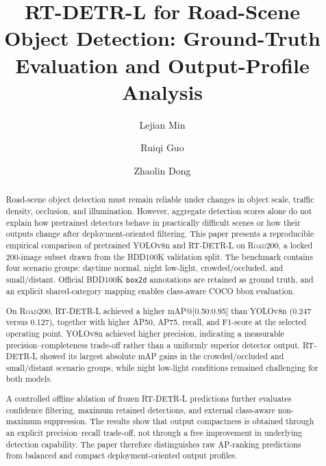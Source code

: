 \documentclass[runningheads]{llncs}
\begin{document}
\title{RT-DETR-L for Road-Scene Object Detection: Ground-Truth Evaluation and Output-Profile Analysis}

\author{
Lejian Min
\and Ruiqi Guo
\and Zhaolin Dong
}



\maketitle

\begin{abstract}
Road-scene object detection must remain reliable under changes in object scale, traffic density, occlusion, and illumination. However, aggregate detection scores alone do not explain how pretrained detectors behave in practically difficult scenes or how their outputs change after deployment-oriented filtering. This paper presents a reproducible empirical comparison of pretrained YOLOv8n and RT-DETR-L on \textsc{Road200}, a locked 200-image subset drawn from the BDD100K validation split. The benchmark contains four scenario groups: daytime normal, night low-light, crowded/occluded, and small/distant. Official BDD100K \texttt{box2d} annotations are retained as ground truth, and an explicit shared-category mapping enables class-aware COCO bbox evaluation.

On \textsc{Road200}, RT-DETR-L achieved a higher mAP@[0.50:0.95] than YOLOv8n (0.247 versus 0.127), together with higher AP50, AP75, recall, and F1-score at the selected operating point. YOLOv8n achieved higher precision, indicating a measurable precision--completeness trade-off rather than a uniformly superior detector output. RT-DETR-L showed its largest absolute mAP gains in the crowded/occluded and small/distant scenario groups, while night low-light conditions remained challenging for both models.

A controlled offline ablation of frozen RT-DETR-L predictions further evaluates confidence filtering, maximum retained detections, and external class-aware non-maximum suppression. The results show that output compactness is obtained through an explicit precision--recall trade-off, not through a free improvement in underlying detection capability. The paper therefore distinguishes raw AP-ranking predictions from balanced and compact deployment-oriented output profiles.
\end{abstract}
\end{document}
